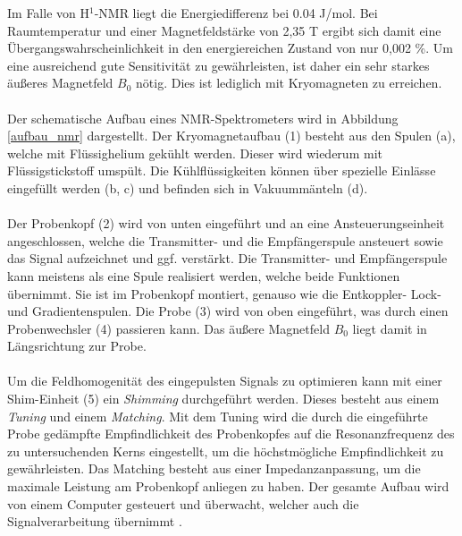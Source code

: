 \documentclass[a4paper, 11pt, headsepline,footsepline,twoside,abstract]{scrbook}
\begin{document}
Im Falle von H$^1$-NMR liegt die Energiedifferenz bei 0.04 J/mol. Bei Raumtemperatur und einer Magnetfeldstärke von 2,35 T ergibt sich damit eine Übergangswahrscheinlichkeit in den energiereichen Zustand von nur 0,002 \%. Um eine ausreichend gute Sensitivität zu gewährleisten, ist daher ein sehr starkes äußeres Magnetfeld $B_0$ nötig. Dies ist lediglich mit Kryomagneten zu erreichen.
\\\\
Der schematische Aufbau eines NMR-Spektrometers wird in Abbildung \ref{aufbau_nmr} dargestellt. Der Kryomagnetaufbau (1) besteht aus den Spulen (a), welche mit Flüssighelium gekühlt werden. Dieser wird wiederum mit Flüssigstickstoff umspült. Die Kühlflüssigkeiten können über spezielle Einlässe eingefüllt werden (b, c) und befinden sich in Vakuummänteln (d).
\\\\
 Der Probenkopf (2) wird von unten eingeführt und an eine Ansteuerungseinheit angeschlossen, welche die Transmitter- und die Empfängerspule ansteuert sowie das Signal aufzeichnet und ggf. verstärkt. Die Transmitter- und Empfängerspule kann meistens als eine Spule realisiert werden, welche beide Funktionen übernimmt. Sie ist im Probenkopf montiert, genauso wie die Entkoppler- Lock- und Gradientenspulen. Die Probe (3) wird von oben eingeführt, was durch einen Probenwechsler (4) passieren kann. Das äußere Magnetfeld $B_0$ liegt damit in Längsrichtung zur Probe. 
\\\\
Um die Feldhomogenität des eingepulsten Signals zu optimieren kann mit einer Shim-Einheit (5) ein \textit{Shimming} durchgeführt werden. Dieses besteht aus einem \textit{Tuning} und einem \textit{Matching}. Mit dem Tuning wird die durch die eingeführte Probe gedämpfte Empfindlichkeit des Probenkopfes auf die Resonanzfrequenz des zu untersuchenden Kerns eingestellt, um die höchstmögliche Empfindlichkeit zu gewährleisten. Das Matching besteht aus einer Impedanzanpassung, um die maximale Leistung am Probenkopf anliegen zu haben. Der gesamte Aufbau wird von einem Computer gesteuert und überwacht, welcher auch die Signalverarbeitung übernimmt \cite{Friebolin2011}.
\end{document}
